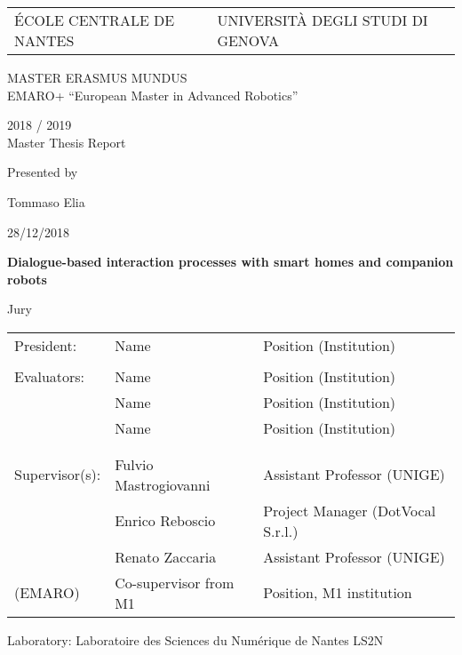 \thispagestyle{empty}

\def\lskip{\vspace{0.5cm}}


\begin{tabular}{p{7cm}p{10cm}}
ÉCOLE CENTRALE DE NANTES
&
\raggedleft UNIVERSITÀ DEGLI STUDI DI GENOVA	%
\end{tabular}

\vspace{2cm}

\begin{center} \large\sc MASTER ERASMUS MUNDUS \\ \normalsize{EMARO+ ``European Master in Advanced Robotics''} \end{center}


\begin{center}
	2018 / 2019\\
	\lskip
	Master Thesis Report
	\lskip
	
	Presented by \lskip 
	
	Tommaso Elia \lskip
	
	28/12/2018 \lskip\lskip
	
	{\Large \textbf{Dialogue-based interaction processes with smart homes and companion robots}}
	
	\vfill

Jury \lskip
		
	\end{center}
	


\begin{tabular}{p{3cm}p{6cm}p{6cm} }
 President: & Name & Position (Institution) \\ & & \\ 
 Evaluators: & Name & Position (Institution) \\
	      & Name & Position (Institution) \\ 
	      & Name & Position (Institution) \\ & & \\  & & \\ 
  Supervisor(s):  & Fulvio Mastrogiovanni & Assistant Professor (UNIGE)\\
		  & Enrico Reboscio & Project Manager (DotVocal S.r.l.) \\
		  & Renato Zaccaria & Assistant Professor (UNIGE) \\
(EMARO)  & Co-supervisor from M1 & Position, M1 institution 
\end{tabular}

\lskip

\begin{flushleft}
 Laboratory: Laboratoire des Sciences du Numérique de Nantes LS2N
\end{flushleft}

\newpage
\thispagestyle{empty}
\null
\newpage
\addtocounter{page}{-1}
\pagestyle{fancy}
